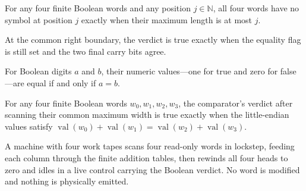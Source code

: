 \begin{lemma}
\label{Complexity.clCmp_blank}
\leanok
{}
For any four finite Boolean words and any position $j\in\mathbb N$, all four words have
no symbol at position $j$ exactly when their maximum length is at most $j$.
\end{lemma}

\begin{definition}
\label{Complexity.clCmpVerdict}
\leanok
At the common right boundary, the verdict is true exactly when the equality flag is still set and the two final carry bits agree.
\end{definition}

\begin{lemma}
\label{Complexity.clBit_eq}
\leanok
{}
For Boolean digits $a$ and $b$, their numeric values—one for true and zero for false—are
equal if and only if $a=b$.
\end{lemma}

\begin{lemma}
\label{Complexity.clCmpVerdict_spec}
\leanok
{}
For any four finite Boolean words $w_0,w_1,w_2,w_3$, the comparator’s verdict after
scanning their common maximum width is true exactly when the little-endian values
satisfy
$\operatorname{val}(w_0)+\operatorname{val}(w_1)=\operatorname{val}(w_2)+\operatorname{val}(w_3)$.
\end{lemma}

\begin{definition}
\label{Complexity.clCmpTM}
\leanok
{}
A machine with four work tapes scans four read-only words in lockstep, feeding each column through the finite addition tables, then rewinds all four heads to zero and idles in a live control carrying the Boolean verdict. No word is modified and nothing is physically emitted.
\end{definition}

